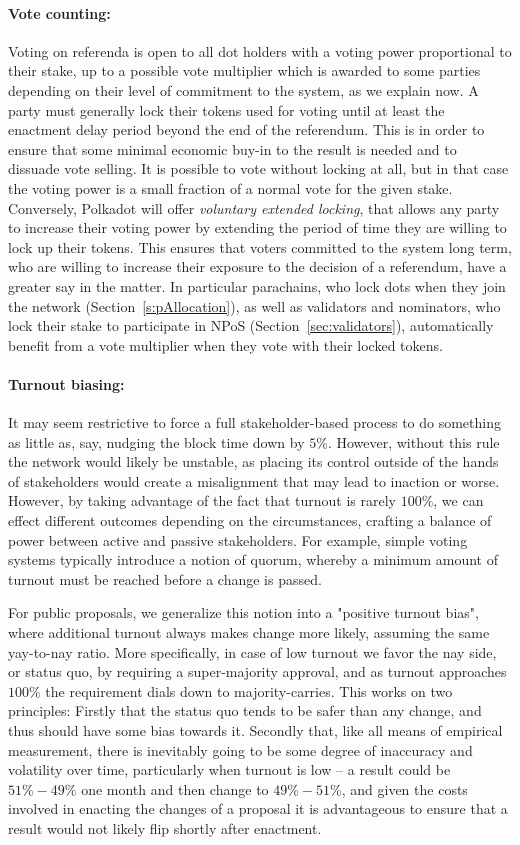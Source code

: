 \paragraph{Vote counting:} Voting on referenda is open to all dot holders with a voting power proportional to their stake, up to a possible vote multiplier which is awarded to some parties depending on their level of commitment to the system, as we explain now. A party must generally lock their tokens used for voting until at least the enactment delay period beyond the end of the referendum. This is in order to ensure that some minimal economic buy-in to the result is needed and to dissuade vote selling. It is possible to vote without locking at all, but in that case the voting power is a small fraction of a normal vote for the given stake. Conversely, Polkadot will offer \emph{voluntary extended locking}, that allows any party to increase their voting power by extending the period of time they are willing to lock up their tokens. This ensures that voters committed to the system long term, who are willing to increase their exposure to the decision of a referendum, have a greater say in the matter. In particular parachains, who lock dots when they join the network (Section~\ref{s:pAllocation}), as well as validators and nominators, who lock their stake to participate in NPoS (Section~\ref{sec:validators}), automatically benefit from a vote multiplier when they vote with their locked tokens.

\paragraph{Turnout biasing:} It may seem restrictive to force a full stakeholder-based process to do something as little as, say, nudging the block time down by $5\%$. However, without this rule the network would likely be unstable, as placing its control outside of the hands of stakeholders would create a misalignment that may lead to inaction or worse. However, by taking advantage of the fact that turnout is rarely $100\%$, we can effect different outcomes depending on the circumstances, crafting a balance of power between active and passive stakeholders. For example, simple voting systems typically introduce a notion of quorum, whereby a minimum amount of turnout must be reached before a change is passed. 

For public proposals, we generalize this notion into a "positive turnout bias", where additional turnout always makes change more likely, assuming the same yay-to-nay ratio. More specifically, in case of low turnout we favor the nay side, or status quo, by requiring a super-majority approval, and as turnout approaches $100\%$ the requirement dials down to majority-carries. This works on two principles: Firstly that the status quo tends to be safer than any change, and thus should have some bias towards it. Secondly that, like all means of empirical measurement, there is inevitably going to be some degree of inaccuracy and volatility over time, particularly when turnout is low -- a result could be $51\%-49\%$ one month and then change to $49\%-51\%$, and given the costs involved in enacting the changes of a proposal it is advantageous to ensure that a result would not likely flip shortly after enactment. 

